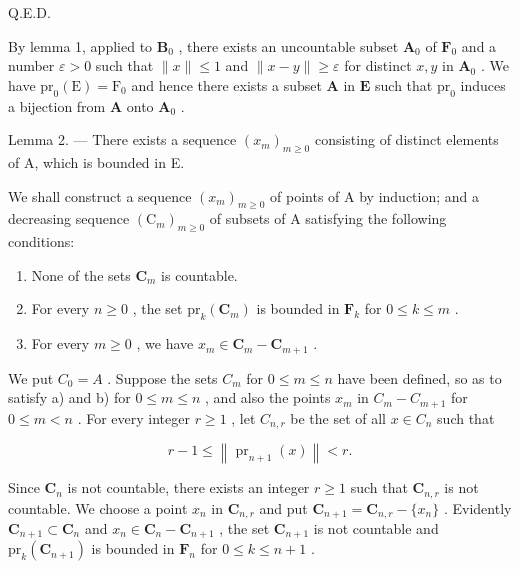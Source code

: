 Q.E.D.

By lemma 1, applied to \(\mathbf{B}_0\) , there exists an uncountable subset \(\mathbf{A}_0\) of \(\mathbf{F}_0\) and a number \(\varepsilon > 0\) such that \(\| x \| \leqslant 1\) and \(\| x - y \| \geqslant \varepsilon\) for distinct \(x, y\) in \(\mathbf{A}_0\) . We have \(\mathrm{pr}_0(\mathrm{E}) = \mathrm{F}_0\) and hence there exists a subset \(\mathbf{A}\) in \(\mathbf{E}\) such that \(\mathrm{pr}_0\) induces a bijection from \(\mathbf{A}\) onto \(\mathbf{A}_0\) .

Lemma 2. --- There exists a sequence \((x_{m})_{m\geqslant 0}\) consisting of distinct elements of A, which is bounded in E.

We shall construct a sequence \((x_{m})_{m\geqslant 0}\) of points of A by induction; and a decreasing sequence \((\mathrm{C}_m)_{m\geqslant 0}\) of subsets of A satisfying the following conditions:

\begin{enumerate}
\def\labelenumi{\alph{enumi})}
\item
  None of the sets \(\mathbf{C}_m\) is countable.
\item
  For every \(n \geqslant 0\) , the set \(\mathrm{pr}_k(\mathbf{C}_m)\) is bounded in \(\mathbf{F}_k\) for \(0 \leqslant k \leqslant m\) .
\item
  For every \(m \geqslant 0\) , we have \(x_{m} \in \mathbf{C}_{m} - \mathbf{C}_{m+1}\) .
\end{enumerate}

We put \(C_0 = A\) . Suppose the sets \(C_m\) for \(0 \leqslant m \leqslant n\) have been defined, so as to satisfy a) and b) for \(0 \leqslant m \leqslant n\) , and also the points \(x_m\) in \(C_m - C_{m+1}\) for \(0 \leqslant m < n\) . For every integer \(r \geqslant 1\) , let \(C_{n,r}\) be the set of all \(x \in C_n\) such that

\[
r - 1 \leqslant \left\| \operatorname{pr} _ {n + 1} (x) \right\| <   r.
\]

Since \(\mathbf{C}_n\) is not countable, there exists an integer \(r \geqslant 1\) such that \(\mathbf{C}_{n,r}\) is not countable. We choose a point \(x_n\) in \(\mathbf{C}_{n,r}\) and put \(\mathbf{C}_{n+1} = \mathbf{C}_{n,r} - \{x_n\}\) . Evidently \(\mathbf{C}_{n+1} \subset \mathbf{C}_n\) and \(x_n \in \mathbf{C}_n - \mathbf{C}_{n+1}\) , the set \(\mathbf{C}_{n+1}\) is not countable and \(\mathrm{pr}_k(\mathbf{C}_{n+1})\) is bounded in \(\mathbf{F}_n\) for \(0 \leqslant k \leqslant n + 1\) .

